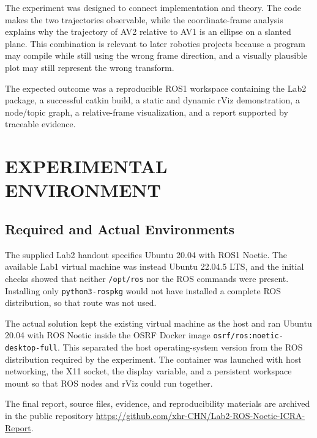 \documentclass[letterpaper, 10 pt, conference]{ieeeconf}
\begin{document}
The experiment was designed to connect implementation and theory. The code makes the two trajectories observable, while the coordinate-frame analysis explains why the trajectory of AV2 relative to AV1 is an ellipse on a slanted plane. This combination is relevant to later robotics projects because a program may compile while still using the wrong frame direction, and a visually plausible plot may still represent the wrong transform.

The expected outcome was a reproducible ROS1 workspace containing the Lab2 package, a successful catkin build, a static and dynamic rViz demonstration, a node/topic graph, a relative-frame visualization, and a report supported by traceable evidence.

\section{EXPERIMENTAL ENVIRONMENT}
\label{sec:environment}
\subsection{Required and Actual Environments}
The supplied Lab2 handout specifies Ubuntu 20.04 with ROS1 Noetic. The available Lab1 virtual machine was instead Ubuntu 22.04.5 LTS, and the initial checks showed that neither \texttt{/opt/ros} nor the ROS commands were present. Installing only \texttt{python3-rospkg} would not have installed a complete ROS distribution, so that route was not used.

The actual solution kept the existing virtual machine as the host and ran Ubuntu 20.04 with ROS Noetic inside the OSRF Docker image \texttt{osrf/ros:noetic-desktop-full}. This separated the host operating-system version from the ROS distribution required by the experiment. The container was launched with host networking, the X11 socket, the display variable, and a persistent workspace mount so that ROS nodes and rViz could run together.

The final report, source files, evidence, and reproducibility materials are archived in the public repository \url{https://github.com/xhr-CHN/Lab2-ROS-Noetic-ICRA-Report}.
\end{document}
